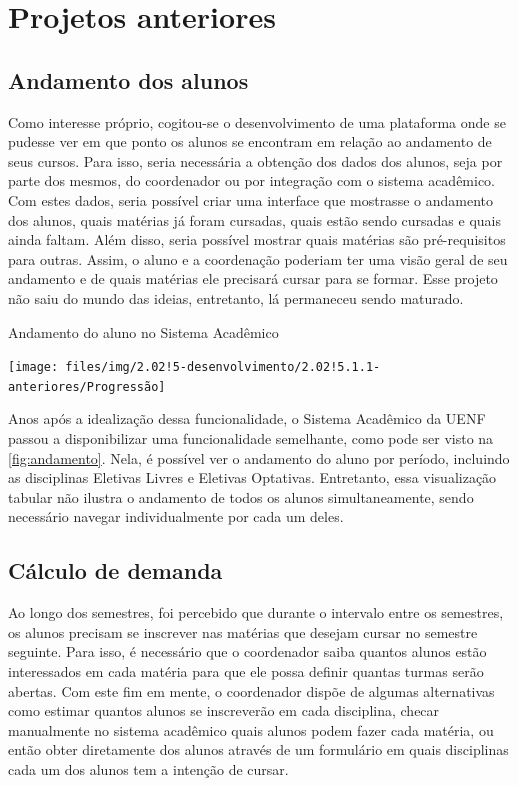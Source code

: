 \section{Projetos anteriores} \label{sec:projetos} %


\subsection{Andamento dos alunos} \label{subsec:andamento} %

Como interesse próprio, cogitou-se o desenvolvimento de uma plataforma onde se pudesse ver em que ponto os alunos se encontram em relação ao andamento de seus cursos. Para isso, seria necessária a obtenção dos dados dos alunos, seja por parte dos mesmos, do coordenador ou por integração com o sistema acadêmico. Com estes dados, seria possível criar uma interface que mostrasse o andamento dos alunos, quais matérias já foram cursadas, quais estão sendo cursadas e quais ainda faltam. Além disso, seria possível mostrar quais matérias são pré-requisitos para outras. Assim, o aluno e a coordenação poderiam ter uma visão geral de seu andamento e de quais matérias ele precisará cursar para se formar. Esse projeto não saiu do mundo das ideias, entretanto, lá permaneceu sendo maturado.

\begin{MyCenteredFigure} \caption{Andamento do aluno no Sistema Acadêmico} \label{fig:andamento}
  \texttt{[image: files/img/2.02!5-desenvolvimento/2.02!5.1.1-anteriores/Progressão]}
\end{MyCenteredFigure}

Anos após a idealização dessa funcionalidade, o Sistema Acadêmico da UENF passou a disponibilizar uma funcionalidade semelhante, como pode ser visto na \autoref{fig:andamento}. Nela, é possível ver o andamento do aluno por período, incluindo as disciplinas Eletivas Livres e Eletivas Optativas. Entretanto, essa visualização tabular não ilustra o andamento de todos os alunos simultaneamente, sendo necessário navegar individualmente por cada um deles.

\subsection{Cálculo de demanda} \label{subsec:demanda} %

Ao longo dos semestres, foi percebido que durante o intervalo entre os semestres, os alunos precisam se inscrever nas matérias que desejam cursar no semestre seguinte. Para isso, é necessário que o coordenador saiba quantos alunos estão interessados em cada matéria para que ele possa definir quantas turmas serão abertas. Com este fim em mente, o coordenador dispõe de algumas alternativas como estimar quantos alunos se inscreverão em cada disciplina, checar manualmente no sistema acadêmico quais alunos podem fazer cada matéria, ou então obter diretamente dos alunos através de um formulário em quais disciplinas cada um dos alunos tem a intenção de cursar.

